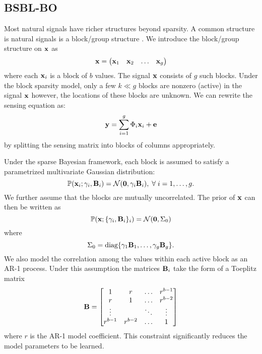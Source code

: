 \subsection{BSBL-BO}
Most natural signals have richer structures beyond
sparsity. A common structure is natural signals
is a block/group structure \cite{eldar2010block}. 
We introduce the block/group structure on $\mathbf{x}$ as
\begin{equation}
\mathbf{x} = \begin{pmatrix}
\mathbf{x}_1 & \mathbf{x}_2 & \dots & \mathbf{x}_g
\end{pmatrix}
\end{equation}
where each $\mathbf{x}_i$ is a block of $b$ values.
The signal $\mathbf{x}$ consists of $g$ such blocks.
Under the block sparsity model, only a few $k \ll g$
blocks are nonzero (active) in the signal $\mathbf{x}$
however, the locations of these blocks are unknown.
We can rewrite the sensing equation as:
\begin{equation}
\mathbf{y} = \sum_{i=1}^g \Phi_i \mathbf{x}_i + \mathbf{e}
\end{equation}
by splitting the sensing matrix into blocks of columns appropriately.

Under the sparse Bayesian framework, each block
is assumed to satisfy a parametrized multivariate
Gaussian distribution:
\begin{equation}
\mathbb{P}(\mathbf{x}_i ; \gamma_i, \mathbf{B}_i) 
= \mathcal{N}(\mathbf{0}, \gamma_i \mathbf{B}_i), \; \forall \; i=1,\dots,g.
\end{equation}
We further assume that the blocks are mutually uncorrelated.
The prior of $\mathbf{x}$ can then be written as
\begin{equation}
\mathbb{P}(\mathbf{x}; \{ \gamma_i, \mathbf{B}_i\}_i ) = \mathcal{N}(\mathbf{0}, \Sigma_0)
\end{equation}
where
\begin{equation}
\Sigma_0 = \text{diag}\{\gamma_1 \mathbf{B}_1, \dots, \gamma_g \mathbf{B}_g \}.
\end{equation}
We also model the correlation among the values
within each active block as an AR-1 process.
Under this assumption the matrices
$\mathbf{B}_i$ take the form of a Toeplitz matrix
\begin{equation}
\mathbf{B} = \begin{bmatrix}
1 & r & \dots & r^{b-1}\\
r & 1 & \dots & r^{b-2}\\
\vdots &  & \ddots & \vdots\\
r^{b-1} & r^{b-2} & \dots & 1
\end{bmatrix}
\end{equation}
where $r$ is the AR-1 model coefficient.
This constraint significantly reduces the model parameters to be learned.

